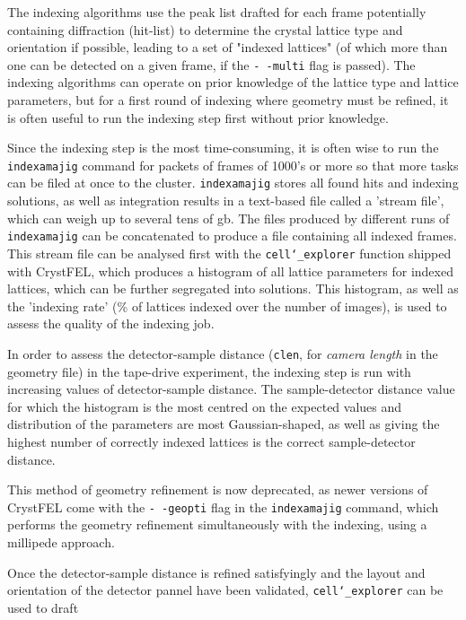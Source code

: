 The indexing algorithms use the peak list drafted for each frame potentially containing diffraction (hit-list) to determine the crystal lattice type and orientation if possible, leading to a set of "indexed lattices" (of which more than one can be detected on a given frame, if the \texttt{- -multi} flag is passed). The indexing algorithms can operate on prior knowledge of the lattice type and lattice parameters, but for a first round of indexing where geometry must be refined, it is often useful to run the indexing step first without prior knowledge. 

Since the indexing step is the most time-consuming, it is often wise to run the \texttt{indexamajig} command for packets of frames of 1000's or more so that more tasks can be filed at once to the cluster. \texttt{indexamajig} stores all found hits and indexing solutions, as well as integration results in a text-based file called a 'stream file', which can weigh up to several tens of gb. The files produced by different runs of \texttt{indexamajig} can be concatenated to produce a file containing all indexed frames. This stream file can be analysed first with the \texttt{cell\char`_explorer} function shipped with CrystFEL, which produces a histogram of all lattice parameters for indexed lattices, which can be further segregated into solutions. This histogram, as well as the 'indexing rate' (\% of lattices indexed over the number of images), is used to assess the quality of the indexing job. 

In order to assess the detector-sample distance (\texttt{clen}, for \textit{camera length} in the geometry file) in the tape-drive experiment, the indexing step is run with increasing values of detector-sample distance. The sample-detector distance value for which the histogram is the most centred on the expected values and distribution of the parameters are most Gaussian-shaped, as well as giving the highest number of correctly indexed lattices is the correct sample-detector distance. 

This method of geometry refinement is now deprecated, as newer versions of CrystFEL come with the \texttt{- -geopti} flag in the \texttt{indexamajig} command, which performs the geometry refinement simultaneously with the indexing, using a millipede approach. 

Once the detector-sample distance is refined satisfyingly and the layout and orientation of the detector pannel have been validated, \texttt{cell\char`_explorer} can be used to draft 

